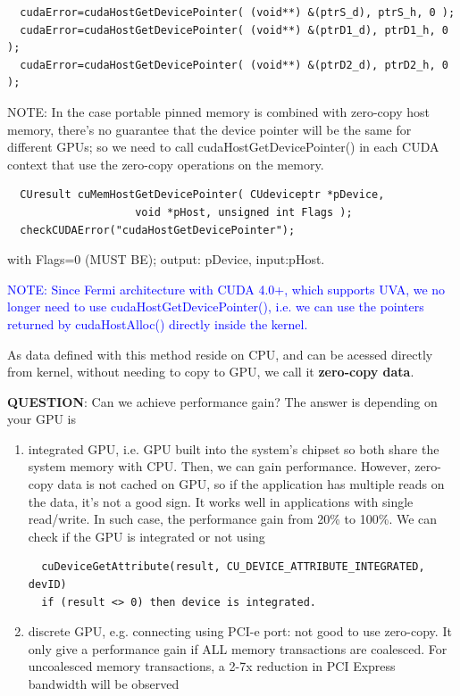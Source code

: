 \begin{enumerate}
  \begin{lstlisting}
  cudaError=cudaHostGetDevicePointer( (void**) &(ptrS_d), ptrS_h, 0 );
  cudaError=cudaHostGetDevicePointer( (void**) &(ptrD1_d), ptrD1_h, 0 );
  cudaError=cudaHostGetDevicePointer( (void**) &(ptrD2_d), ptrD2_h, 0 );
  \end{lstlisting}
  NOTE: In the case portable pinned memory is combined with zero-copy host
  memory, there's no guarantee that the device pointer will be the same for
  different GPUs; so we need to call cudaHostGetDevicePointer() in each CUDA
  context that use the zero-copy operations on the memory.
  \begin{lstlisting}
  CUresult cuMemHostGetDevicePointer( CUdeviceptr *pDevice,
                    void *pHost, unsigned int Flags );
  checkCUDAError("cudaHostGetDevicePointer");                    
  \end{lstlisting}
  with Flags=0 (MUST BE); output: pDevice, input:pHost.
% 
  
\textcolor{blue}{NOTE: Since Fermi architecture with CUDA 4.0+, which supports
UVA, we no longer need to use cudaHostGetDevicePointer(), i.e. we can use the
pointers returned by cudaHostAlloc() directly inside the kernel. }
\end{enumerate}

As data defined with this method reside on CPU, and can be acessed directly from
kernel, without needing to copy to GPU, we call it {\bf zero-copy data}. 


{\bf QUESTION}: Can we achieve performance gain? The answer is
depending on your GPU is
\begin{enumerate}
  \item integrated GPU, i.e. GPU built into the system's chipset so both share
  the system memory with CPU. Then, we can gain performance. However, zero-copy
  data is not cached on GPU, so if the application has multiple reads on the
  data, it's not a good sign. It works well in applications with single
  read/write. In such case, the performance gain from 20\% to 100\%. We can
  check if the GPU is integrated or not using
  \begin{verbatim}
  cuDeviceGetAttribute(result, CU_DEVICE_ATTRIBUTE_INTEGRATED, devID)
  if (result <> 0) then device is integrated.
  \end{verbatim}

  \item discrete GPU, e.g. connecting using PCI-e port: not good to use
  zero-copy. It only give a performance gain if ALL memory transactions are
  coalesced. For uncoalesced memory transactions, a 2-7x reduction in PCI
Express bandwidth will be observed
\end{enumerate}

